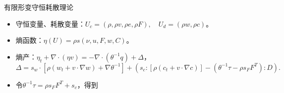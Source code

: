 \documentclass[mathserif]{beamer}
\begin{document}
\begin{frame}{有限形变守恒耗散理论}
\begin{itemize}
	\item<2-> 守恒变量、耗散变量：$U_c = (\rho, \rho v, \rho e, \rho F),\quad U_d  =(\rho w, \rho c)$。
	\item<3-> 熵函数：$\eta(U) = \rho s(\nu,u,F,w,C)$。%
	\item<4-> 熵产：$\eta_t + \nabla \cdot (\eta v) = -\nabla \cdot (\theta^{-1} q) + \Delta$，
	$$\Delta = s_w \cdot [\rho (w_t + v \cdot \nabla w)+\nabla \theta^{-1}] + (s_c:[\rho (c_t + v \cdot \nabla c)] - ( \theta^{-1} \tau - \rho s_F F^T) : D).$$
	\item<5-> 令$\theta^{-1} \tau = \rho s_F F^T + s_c$，得到
\end{itemize}



\end{frame}
\end{document}
